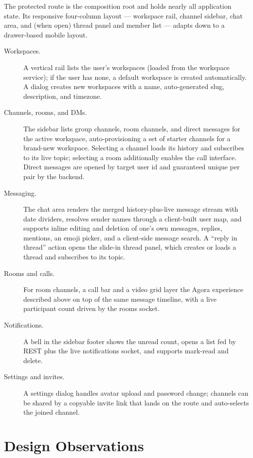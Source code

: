 The protected  route is the composition root and holds nearly all
application state. Its responsive four-column layout --- workspace rail, channel
sidebar, chat area, and (when open) thread panel and member list --- adapts down
to a drawer-based mobile layout.

\begin{description}
  \item[Workspaces.] A vertical rail lists the user's workspaces (loaded from the
  workspace service); if the user has none, a default workspace is created
  automatically. A dialog creates new workspaces with a name, auto-generated slug,
  description, and timezone.
  \item[Channels, rooms, and DMs.] The sidebar lists group channels, room
  channels, and direct messages for the active workspace, auto-provisioning a set
  of starter channels for a brand-new workspace. Selecting a channel loads its
  history and subscribes to its live topic; selecting a room additionally enables
  the call interface. Direct messages are opened by target user id and guaranteed
  unique per pair by the backend.
  \item[Messaging.] The chat area renders the merged history-plus-live message
  stream with date dividers, resolves sender names through a client-built user
  map, and supports inline editing and deletion of one's own messages, replies,
  mentions, an emoji picker, and a client-side message search. A ``reply in
  thread'' action opens the slide-in thread panel, which creates or loads a thread
  and subscribes to its topic.
  \item[Rooms and calls.] For room channels, a call bar and a video grid layer the
  Agora experience described above on top of the same message timeline, with a
  live participant count driven by the rooms socket.
  \item[Notifications.] A bell in the sidebar footer shows the unread count, opens
  a list fed by REST plus the live notifications socket, and supports mark-read
  and delete.
  \item[Settings and invites.] A settings dialog handles avatar upload and
  password change; channels can be shared by a copyable invite link that lands on
  the  route and auto-selects the joined channel.
\end{description}

\section{Design Observations}

